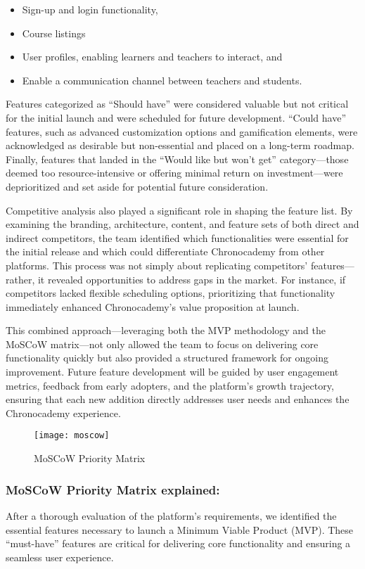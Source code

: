 \begin{itemize}
    \item Sign-up and login functionality,
    \item Course listings
    \item User profiles, enabling learners and teachers to interact, and
    \item Enable a communication channel between teachers and students.
\end{itemize}
Features categorized as ``Should have'' were considered valuable but not critical for the initial launch and were scheduled for future development.
``Could have'' features, such as advanced customization options and gamification elements, were acknowledged as desirable but non-essential and placed on a long-term roadmap.
Finally, features that landed in the ``Would like but won’t get'' category—those deemed too resource-intensive or offering minimal return on investment—were deprioritized and set aside for potential future consideration.

Competitive analysis also played a significant role in shaping the feature list.
By examining the branding, architecture, content, and feature sets of both direct and indirect competitors, the team identified which functionalities were essential for the initial release and which could differentiate Chronocademy from other platforms.
This process was not simply about replicating competitors’ features—rather, it revealed opportunities to address gaps in the market.
For instance, if competitors lacked flexible scheduling options, prioritizing that functionality immediately enhanced Chronocademy’s value proposition at launch.

This combined approach—leveraging both the MVP methodology and the MoSCoW matrix—not only allowed the team to focus on delivering core functionality quickly but also provided a structured framework for ongoing improvement.
Future feature development will be guided by user engagement metrics, feedback from early adopters, and the platform’s growth trajectory, ensuring that each new addition directly addresses user needs and enhances the Chronocademy experience.

\begin{figure}[h]
    \centering
    \texttt{[image: moscow]}
    \caption{MoSCoW Priority Matrix}
    \label{fig:figure11}
\end{figure}

\subsubsection{MoSCoW Priority Matrix explained:}
After a thorough evaluation of the platform's requirements, we identified the essential features necessary to launch a Minimum Viable Product (MVP). These ``must-have'' features are critical for delivering core functionality and ensuring a seamless user experience.


